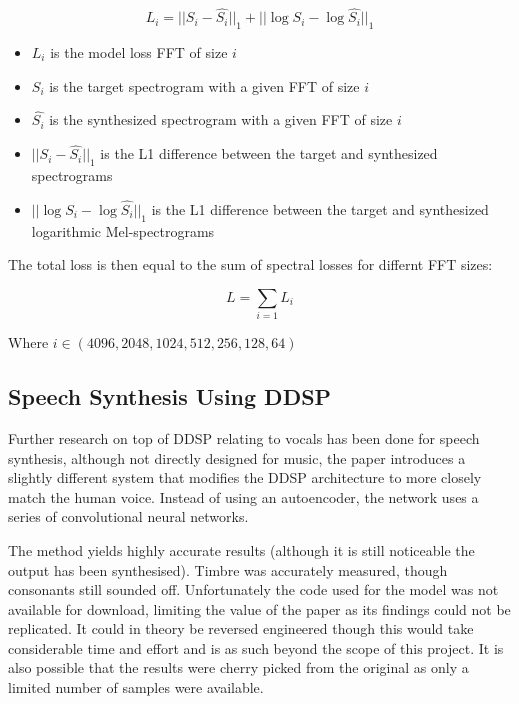\vspace{0.5cm}
\vspace{0.5cm}

\begin{equation}
    L_i = ||S_i - \hat{S_i}||_1 + ||\log{S_i} - \log\hat{S_i}||_1
\end{equation}

\begin{itemize}
    \item $L_i$ is the model loss FFT of size $i$
    \item $S_i$ is the target spectrogram with a given FFT of size $i$
    \item $\hat{S_i}$ is the synthesized spectrogram with a given FFT of size $i$
    \item $||S_i - \hat{S_i}||_1$ is the L1 difference between the target and synthesized spectrograms
    \item $||\log{S_i} - \log\hat{S_i}||_1$ is the L1 difference between the target and synthesized logarithmic Mel-spectrograms
\end{itemize}

The total loss is then equal to the sum of spectral losses for differnt FFT sizes:

\begin{equation}
    L = \sum_{i=1} L_i
\end{equation}

Where $i \in (4096, 2048, 1024, 512, 256, 128, 64)$

\subsection{Speech Synthesis Using DDSP}

Further research on top of DDSP relating to vocals has been done for speech synthesis, although not directly designed for music, the paper introduces a slightly different system that modifies the DDSP architecture to more closely match the human voice\cite{SpeechDDSP}. Instead of using an autoencoder, the network uses a series of convolutional neural networks.

The method yields highly accurate results (although it is still noticeable the output has been synthesised). Timbre was accurately measured, though consonants still sounded off. Unfortunately the code used for the model was not available for download, limiting the value of the paper as its findings could not be replicated. It could in theory be reversed engineered though this would take considerable time and effort and is as such beyond the scope of this project. It is also possible that the results were cherry picked from the original as only a limited number of samples were available.

